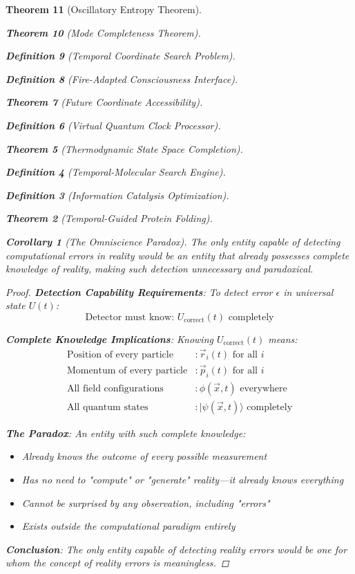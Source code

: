 \documentclass[12pt,a4paper]{article}
\newtheorem{theorem}{Theorem}[section]
\newtheorem{corollary}[theorem]{Corollary}
\newtheorem{definition}[theorem]{Definition}
\begin{document}
\begin{theorem}[Oscillatory Entropy Theorem]
\begin{theorem}[Mode Completeness Theorem]
\begin{enumerate}
\begin{definition}[Temporal Coordinate Search Problem]
\begin{algorithm}
\begin{definition}[Fire-Adapted Consciousness Interface]
\begin{theorem}[Future Coordinate Accessibility]
\begin{definition}[Virtual Quantum Clock Processor]
\begin{itemize}
\begin{itemize}
\begin{theorem}[Thermodynamic State Space Completion]
\begin{definition}[Temporal-Molecular Search Engine]
\begin{definition}[Information Catalysis Optimization]
\begin{algorithm}
\begin{theorem}[Temporal-Guided Protein Folding]
\begin{table}[h]
\begin{corollary}[The Omniscience Paradox]
The only entity capable of detecting computational errors in reality would be an entity that already possesses complete knowledge of reality, making such detection unnecessary and paradoxical.
\end{corollary}

\begin{proof}
\textbf{Detection Capability Requirements}: To detect error $\epsilon$ in universal state $U(t)$:
$$\text{Detector must know: } U_{\text{correct}}(t) \text{ completely}$$

\textbf{Complete Knowledge Implications}: Knowing $U_{\text{correct}}(t)$ means:
\begin{align}
\text{Position of every particle} &: \vec{r}_i(t) \text{ for all } i \\
\text{Momentum of every particle} &: \vec{p}_i(t) \text{ for all } i \\
\text{All field configurations} &: \phi(\vec{x},t) \text{ everywhere} \\
\text{All quantum states} &: |\psi(\vec{x},t)\rangle \text{ completely}
\end{align}

\textbf{The Paradox}: An entity with such complete knowledge:
\begin{itemize}
    \item Already knows the outcome of every possible measurement
    \item Has no need to "compute" or "generate" reality—it already knows everything
    \item Cannot be surprised by any observation, including "errors"
    \item Exists outside the computational paradigm entirely
\end{itemize}

\textbf{Conclusion}: The only entity capable of detecting reality errors would be one for whom the concept of reality errors is meaningless.
\end{proof}



\end{table}
\end{theorem}
\end{algorithm}
\end{definition}
\end{definition}
\end{theorem}
\end{itemize}
\end{itemize}
\end{definition}
\end{theorem}
\end{definition}
\end{algorithm}
\end{definition}
\end{enumerate}
\end{theorem}
\end{theorem}
\end{document}
